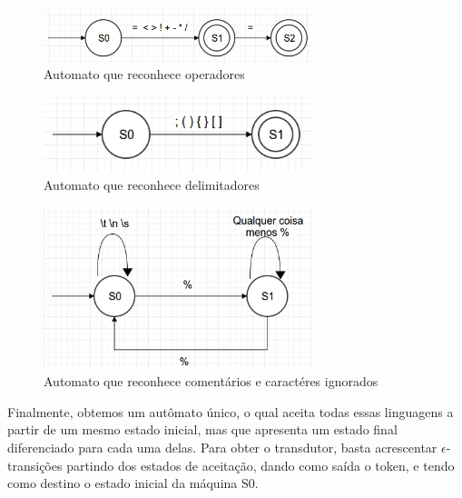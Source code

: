 \begin{figure}[H]
  \caption{Automato que reconhece operadores}
  \centering
    \includegraphics[width=0.7\textwidth]{../0-lexico/automatos/operators}
\end{figure}

\begin{figure}[H]
  \caption{Automato que reconhece delimitadores}
  \centering
    \includegraphics[width=0.7\textwidth]{../0-lexico/automatos/delimiters}
\end{figure}

\begin{figure}[H]
  \caption{Automato que reconhece comentários e caractéres ignorados}
  \centering
    \includegraphics[width=0.7\textwidth]{../0-lexico/automatos/non-used}
\end{figure}

Finalmente, obtemos um autômato único, o qual aceita todas essas linguagens a partir de um mesmo estado inicial, mas que apresenta um estado final diferenciado para cada uma delas. Para obter o transdutor, basta acrescentar $\epsilon$-transições partindo dos estados de aceitação, dando como saída o token, e tendo como destino o estado inicial da máquina S0.

